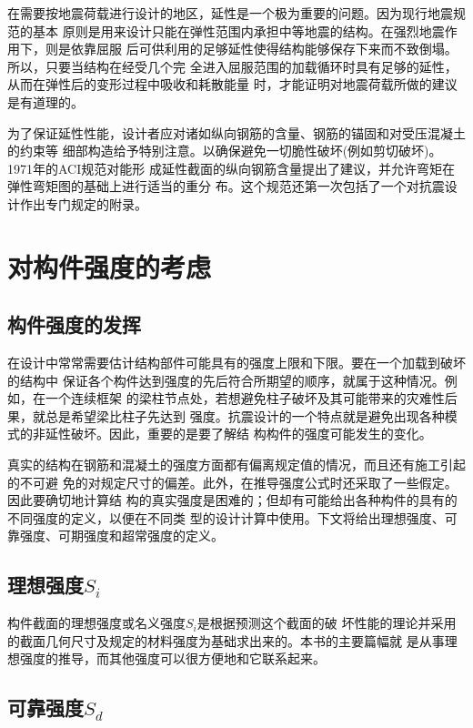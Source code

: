 \documentclass[12pt,a4paper]{book}
\begin{document}
在需要按地震荷载进行设计的地区，延性是一个极为重要的问题。因为现行地震规范的基本
原则是用来设计只能在弹性范围内承担中等地震的结构。在强烈地震作用下，则是依靠屈服
后可供利用的足够延性使得结构能够保存下来而不致倒塌。所以，只要当结构在经受几个完
全进入屈服范围的加载循环时具有足够的延性，从而在弹性后的变形过程中吸收和耗散能量
时，才能证明对地震荷载所做的建议是有道理的。

为了保证延性性能，设计者应对诸如纵向钢筋的含量、钢筋的锚固和对受压混凝土的约束等
细部构造给予特别注意。以确保避免一切脆性破坏(例如剪切破坏)。1971年的ACI规范对能形
成延性截面的纵向钢筋含量提出了建议，并允许弯矩在弹性弯矩图的基础上进行适当的重分
布。这个规范还第一次包括了一个对抗震设计作出专门规定的附录。

\section{对构件强度的考虑}

\subsection{构件强度的发挥}

在设计中常常需要估计结构部件可能具有的强度上限和下限。要在一个加载到破坏的结构中
保证各个构件达到强度的先后符合所期望的顺序，就属于这种情况。例如，在一个连续框架
的梁柱节点处，若想避免柱子破坏及其可能带来的灾难性后果，就总是希望梁比柱子先达到
强度。抗震设计的一个特点就是避免出现各种模式的非延性破坏。因此，重要的是要了解结
构构件的强度可能发生的变化。

真实的结构在钢筋和混凝土的强度方面都有偏离规定值的情况，而且还有施工引起的不可避
免的对规定尺寸的偏差。此外，在推导强度公式时还采取了一些假定。因此要确切地计算结
构的真实强度是困难的；但却有可能给出各种构件的具有的不同强度的定义，以便在不同类
型的设计计算中使用。下文将给出理想强度、可靠强度、可期强度和超常强度的定义。

\subsection{理想强度$S_i$}构件截面的理想强度或名义强度$S_i$是根据预测这个截面的破
坏性能的理论并采用的截面几何尺寸及规定的材料强度为基础求出来的。本书的主要篇幅就
是从事理想强度的推导，而其他强度可以很方便地和它联系起来。

\subsection{可靠强度$S_d$}
\end{document}
